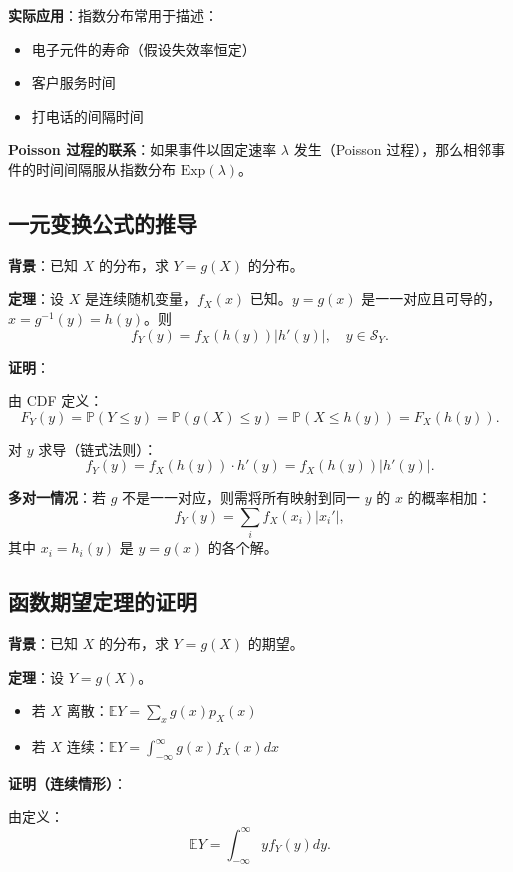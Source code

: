 \textbf{实际应用}：指数分布常用于描述：
\begin{itemize}
\item 电子元件的寿命（假设失效率恒定）
\item 客户服务时间
\item 打电话的间隔时间
\end{itemize}

\textbf{Poisson 过程的联系}：如果事件以固定速率 $\lambda$ 发生（Poisson 过程），那么相邻事件的时间间隔服从指数分布 $\text{Exp}(\lambda)$。

\subsection{一元变换公式的推导}\label{sec:derivation-transformation-formula}

\textbf{背景}：已知 $X$ 的分布，求 $Y = g(X)$ 的分布。

\textbf{定理}：设 $X$ 是连续随机变量，$f_X(x)$ 已知。$y = g(x)$ 是一一对应且可导的，$x = g^{-1}(y) = h(y)$。则
\[
f_Y(y) = f_X(h(y)) \left| h'(y) \right|, \quad y \in \mathcal{S}_Y.
\]

\textbf{证明}：

由 CDF 定义：
\[
F_Y(y) = \mathbb{P}(Y \leq y) = \mathbb{P}(g(X) \leq y) = \mathbb{P}(X \leq h(y)) = F_X(h(y)).
\]

对 $y$ 求导（链式法则）：
\[
f_Y(y) = f_X(h(y)) \cdot h'(y) = f_X(h(y)) \left| h'(y) \right|.
\]

\textbf{多对一情况}：若 $g$ 不是一一对应，则需将所有映射到同一 $y$ 的 $x$ 的概率相加：
\[
f_Y(y) = \sum_{i} f_X(x_i) \left| x_i' \right|,
\]
其中 $x_i = h_i(y)$ 是 $y = g(x)$ 的各个解。

\subsection{函数期望定理的证明}\label{sec:derivation-function-expectation}

\textbf{背景}：已知 $X$ 的分布，求 $Y = g(X)$ 的期望。

\textbf{定理}：设 $Y = g(X)$。
\begin{itemize}
\item 若 $X$ 离散：$\mathbb{E}Y = \sum_x g(x) p_X(x)$
\item 若 $X$ 连续：$\mathbb{E}Y = \int_{-\infty}^{\infty} g(x) f_X(x) dx$
\end{itemize}

\textbf{证明（连续情形）}：

由定义：
\[
\mathbb{E}Y = \int_{-\infty}^{\infty} y f_Y(y) dy.
\]


